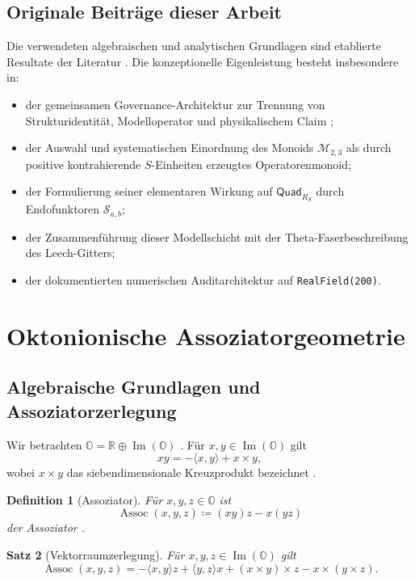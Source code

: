 \documentclass[11pt,a4paper]{article}
\newtheorem{theorem}{Satz}[section]
\newtheorem{definition}[theorem]{Definition}
\newcommand{\Oalg}{\mathbb{O}}
\newcommand{\ImO}{\operatorname{Im}(\mathbb{O})}
\newcommand{\Assoc}{\operatorname{Assoc}}
\newcommand{\Mmon}{\mathcal{M}_{2,3}}
\begin{document}
\subsection*{Originale Beiträge dieser Arbeit}
Die verwendeten algebraischen und analytischen Grundlagen sind etablierte Resultate der Literatur \cite{baez,conway,serre,cassels,weil,ebeling}. Die konzeptionelle Eigenleistung besteht insbesondere in:
\begin{itemize}
  \item der gemeinsamen Governance-Architektur zur Trennung von Strukturidentität, Modelloperator und physikalischem Claim \cite{eabcAudit};
  \item der Auswahl und systematischen Einordnung des Monoids $\Mmon$ als durch positive kontrahierende $S$-Einheiten erzeugtes Operatorenmonoid;
  \item der Formulierung seiner elementaren Wirkung auf $\mathsf{Quad}_{R_S}$ durch Endofunktoren $\mathscr{S}_{a,b}$;
  \item der Zusammenführung dieser Modellschicht mit der Theta-Faserbeschreibung des Leech-Gitters;
  \item der dokumentierten numerischen Auditarchitektur auf \texttt{RealField(200)}.
\end{itemize}

\section{Oktonionische Assoziatorgeometrie}

\subsection{Algebraische Grundlagen und Assoziatorzerlegung}
Wir betrachten $\Oalg=\mathbb{R}\oplus\ImO$ \cite{baez}. Für $x,y\in\ImO$ gilt
\[
xy=-\langle x,y\rangle+x\times y,
\]
wobei $x\times y$ das siebendimensionale Kreuzprodukt bezeichnet \cite{harvey}.

\begin{definition}[Assoziator]
Für $x,y,z\in\Oalg$ ist
\[
\Assoc(x,y,z)\coloneqq(xy)z-x(yz)
\]
der Assoziator \cite{schafer}.
\end{definition}

\begin{theorem}[Vektorraumzerlegung]
Für $x,y,z\in\ImO$ gilt
\begin{equation}
\Assoc(x,y,z)=-\langle x,y\rangle z+\langle y,z\rangle x+(x\times y)\times z-x\times(y\times z).
\end{equation}
\end{theorem}
\end{document}
